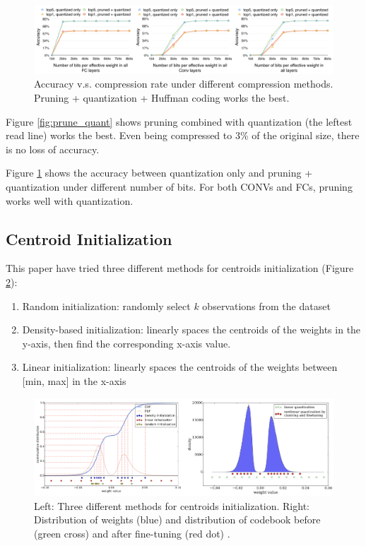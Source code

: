 \documentclass[12pt]{article}
\begin{document}
\begin{figure}
    \centering
    \includegraphics[width=0.9\linewidth]{images/f7_acc_drop.png}
    \caption{Accuracy v.s. compression rate under different compression methods. Pruning + quantization + Huffman coding works the best.}
    \label{fig:acc_drop}
\end{figure}

Figure \ref{fig:prune_quant} shows pruning combined with quantization (the leftest read line) works the best. Even being compressed to 3\% of the original size, there is no loss of accuracy.

Figure \ref{fig:acc_drop} shows the accuracy between quantization only and pruning + quantization under different number of bits. For both CONVs and FCs, pruning works well with quantization.

\subsection{Centroid Initialization}

This paper have tried three different methods for centroids initialization (Figure \ref{fig:centroid_init}):

\begin{enumerate}
    \item Random initialization: randomly select $k$ observations from the dataset
    \item Density-based initialization: linearly spaces the centroids of the weights in the y-axis, then find the corresponding x-axis value.
    \item Linear initialization: linearly spaces the centroids of the weights between [min, max] in the x-axis
\end{enumerate}

\begin{figure}
    \centering
    \includegraphics[width=0.8\linewidth]{images/f4_centroid_init.png}
    \caption{Left: Three different methods for centroids initialization. Right: Distribution of weights (blue) and distribution of codebook before (green cross) and after fine-tuning (red dot) \cite{han2015deep_compression}.}
    \label{fig:centroid_init}
\end{figure}
\end{document}
